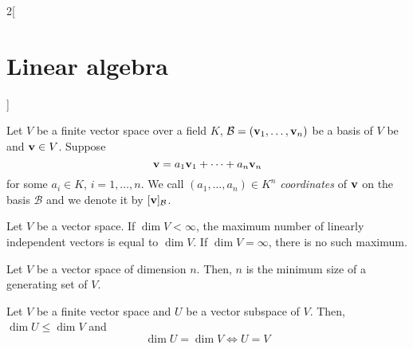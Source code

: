 \documentclass[../../../main_math.tex]{subfiles}
\begin{document}
\begin{multicols}{2}[\section{Linear algebra}]
\begin{definition}
  \end{definition}
  \begin{definition}
    Let $V$ be a finite vector space over a field $K$, $\mathcal{B}=(\boldsymbol{\mathrm{v}}_1,\ldots,\boldsymbol{\mathrm{v}}_n)$ be a basis of $V$ be and $\boldsymbol{\mathrm{v}}\in V$. Suppose $$\boldsymbol{\mathrm{v}}=a_1\boldsymbol{\mathrm{v}}_1+\cdots+a_n\boldsymbol{\mathrm{v}}_n$$ for some $a_i\in K$, $i=1,\ldots,n$. We call $(a_1,\ldots,a_n)\in K^n$ \emph{coordinates} of $\boldsymbol{\mathrm{v}}$ on the basis $\mathcal{B}$ and we denote it by $[\boldsymbol{\mathrm{v}}]_{\mathcal{B}}$.
  \end{definition}
  \begin{proposition}
    Let $V$ be a vector space. If $\dim V<\infty$, the maximum number of linearly independent vectors is equal to $\dim V$. If $\dim V=\infty$, there is no such maximum.
  \end{proposition}
  \begin{proposition}
    Let $V$ be a vector space of dimension $n$. Then, $n$ is the minimum size of a generating set of $V$.
  \end{proposition}
  \begin{proposition}
    Let $V$ be a finite vector space and $U$ be a vector subspace of $V$. Then, $\dim U\leq\dim V$ and $$\dim U=\dim V\iff U=V$$
  \end{proposition}

\end{multicols}
\end{document}
